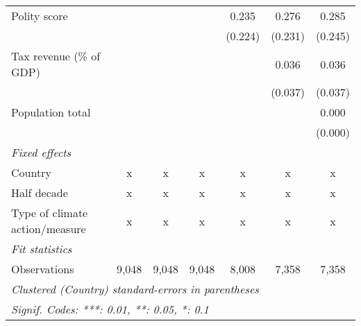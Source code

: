 \begin{tabular}{lcccccc}
   Polity score                                                          &         &               &               & 0.235         & 0.276         & 0.285\\   
                                                                         &         &               &               & (0.224)       & (0.231)       & (0.245)\\   
   Tax revenue (\% of GDP)                                               &         &               &               &               & 0.036         & 0.036\\   
                                                                         &         &               &               &               & (0.037)       & (0.037)\\   
   Population total                                                      &         &               &               &               &               & 0.000\\   
                                                                         &         &               &               &               &               & (0.000)\\   
   \emph{Fixed effects}\\
   Country                                                               & x       & x             & x             & x             & x             & x\\  
   Half decade                                                           & x       & x             & x             & x             & x             & x\\  
   Type of climate action/measure                                        & x       & x             & x             & x             & x             & x\\  
   \midrule \emph{Fit statistics}\\
   Observations                                                          & 9,048   & 9,048         & 9,048         & 8,008         & 7,358         & 7,358\\  
   \midrule
   \multicolumn{7}{l}{\emph{Clustered (Country) standard-errors in parentheses}}\\
   \multicolumn{7}{l}{\emph{Signif. Codes: ***: 0.01, **: 0.05, *: 0.1}}\\
\end{tabular}
\par\endgroup


